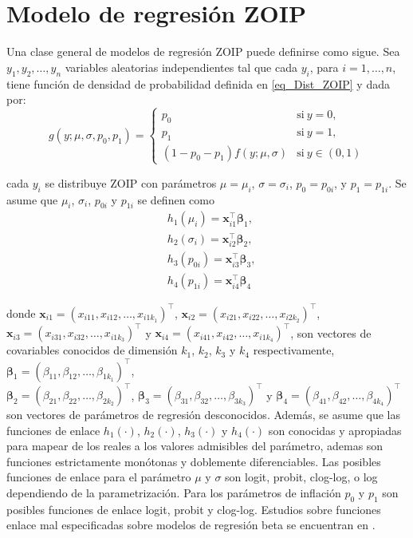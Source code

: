 \section{Modelo de regresi\'{o}n ZOIP}

Una clase general de modelos de regresi\'{o}n ZOIP puede definirse como sigue. Sea $y_1, y_2,\ldots, y_n$ variables aleatorias independientes tal que cada $y_i$, para $i=1,\ldots, n$, tiene funci\'{o}n de densidad de probabilidad definida en \eqref{eq_Dist_ZOIP} y dada por:
\begin{equation*}
g(y;\mu,\sigma, p_{0}, p_{1})=
\begin{cases}
p_{0} & \text{si}\ y=0,\\
p_{1} & \text{si}\ y=1,\\
(1-p_{0}-p_{1})f(y;\mu,\sigma) & \text{si}\ y \in (0,1)
\end{cases}
\end{equation*}

cada $y_i$ se distribuye ZOIP con par\'{a}metros $\mu = \mu_i$, $\sigma=\sigma_i$, $p_0=p_{0i}$, y $p_1=p_{1i}$. Se asume que $\mu_i$, $\sigma_i$, $p_{0i}$ y $p_{1i}$ se definen como
\begin{equation}
\begin{split}
&h_1(\mu_{i})=\mathbf{x}_{i1}^{\top} \boldsymbol{\beta}_1,\\
&h_2(\sigma_{i})=\mathbf{x}_{i2}^{\top} \boldsymbol{\beta}_2,\\
&h_3(p_{0i})=\mathbf{x}_{i3}^{\top} \boldsymbol{\beta}_3,\\
&h_4(p_{1i}) =\mathbf{x}_{i4}^{\top} \boldsymbol{\beta}_4
\end{split}
\label{eq_reg}
\end{equation}

donde $\mathbf{x}_{i1}=(x_{i11}, x_{i12},\ldots, x_{i1k_1})^{\top}$, $\mathbf{x}_{i2}=(x_{i21}, x_{i22},\ldots, x_{i2k_2})^{\top}$, \\
$\mathbf{x}_{i3}=(x_{i31}, x_{i32},\ldots, x_{i1k_3})^{\top}$ y $\mathbf{x}_{i4}=(x_{i41}, x_{i42},\ldots, x_{i1k_4})^{\top}$, son vectores de covariables conocidos de dimensi\'{o}n $k_1$, $k_2$, $k_3$ y $k_4$ respectivamente, $\boldsymbol{\beta}_1=(\beta_{11}, \beta_{12},\ldots, \beta_{1k_1})^{\top}$, \\
$\boldsymbol{\beta}_2=(\beta_{21}, \beta_{22},\ldots, \beta_{2k_2})^{\top}$, $\boldsymbol{\beta}_3=(\beta_{31}, \beta_{32},\ldots, \beta_{3k_3})^{\top}$ y $\boldsymbol{\beta}_4=(\beta_{41}, \beta_{42},\ldots, \beta_{4k_4})^{\top}$ son vectores de par\'{a}metros de regresi\'{o}n desconocidos. Adem\'{a}s, se asume que las funciones de enlace $h_1(\cdot)$, $h_2(\cdot)$, $h_3(\cdot)$ y $h_4(\cdot)$ son conocidas y apropiadas para mapear de los reales a los valores admisibles del par\'{a}metro, ademas son funciones estrictamente mon\'{o}tonas y doblemente diferenciables. Las posibles funciones de enlace para el par\'{a}metro $\mu$ y $\sigma$ son logit, probit, clog-log, o log dependiendo de la parametrizaci\'{o}n. Para los par\'{a}metros de inflaci\'{o}n $p_0$ y $p_1$ son posibles funciones de enlace logit, probit y clog-log. Estudios sobre funciones enlace mal especificadas sobre modelos de regresi\'{o}n beta se encuentran en \cite{andrade07}.

